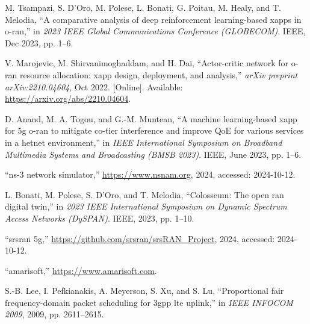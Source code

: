 \begin{thebibliography}{99}
M. Tsampazi, S. D’Oro, M. Polese, L. Bonati, G. Poitau, M. Healy, and T. Melodia, “A comparative analysis of deep reinforcement learning-based xapps in o-ran,” in \textit{2023 IEEE Global Communications Conference (GLOBECOM)}. IEEE, Dec 2023, pp. 1–6.

V. Marojevic, M. Shirvanimoghaddam, and H. Dai, “Actor-critic network for o-ran resource allocation: xapp design, deployment, and analysis,” \textit{arXiv preprint arXiv:2210.04604}, Oct 2022. [Online]. Available: \url{https://arxiv.org/abs/2210.04604}.

D. Anand, M. A. Togou, and G.-M. Muntean, “A machine learning-based xapp for 5g o-ran to mitigate co-tier interference and improve QoE for various services in a hetnet environment,” in \textit{IEEE International Symposium on Broadband Multimedia Systems and Broadcasting (BMSB 2023)}. IEEE, June 2023, pp. 1–6.

“ns-3 network simulator,” \url{https://www.nsnam.org}, 2024, accessed: 2024-10-12.

L. Bonati, M. Polese, S. D’Oro, and T. Melodia, “Colosseum: The open ran digital twin,” in \textit{2023 IEEE International Symposium on Dynamic Spectrum Access Networks (DySPAN)}. IEEE, 2023, pp. 1–10.

“srsran 5g,” \url{https://github.com/srsran/srsRAN_Project}, 2024, accessed: 2024-10-12.

“amarisoft,” \url{https://www.amarisoft.com}.

S.-B. Lee, I. Pefkianakis, A. Meyerson, S. Xu, and S. Lu, “Proportional fair frequency-domain packet scheduling for 3gpp lte uplink,” in \textit{IEEE INFOCOM 2009}, 2009, pp. 2611–2615.


\end{thebibliography}
